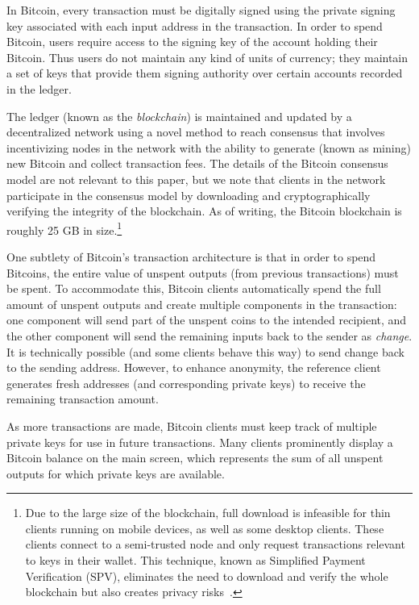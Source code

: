 In Bitcoin, every transaction must be digitally signed using the private signing key associated with each input address in the transaction. In order to spend Bitcoin, users require access to the signing key of the account holding their Bitcoin. Thus users do not maintain any kind of units of currency; they maintain a set of keys that provide them signing authority over certain accounts recorded in the ledger. 

The ledger (known as the \emph{blockchain}) is maintained and updated by a decentralized network using a novel method to reach consensus that involves incentivizing nodes in the network with the ability to generate (known as mining) new Bitcoin and collect transaction fees. The details of the Bitcoin consensus model are not relevant to this paper, but we note that clients in the network participate in the consensus model by downloading and cryptographically verifying the integrity of the blockchain. As of writing, the Bitcoin blockchain is roughly 25 GB in size.\footnote{Due to the large size of the blockchain, full download is infeasible for thin clients running on mobile devices, as well as some desktop clients. These clients connect to a semi-trusted node and only request transactions relevant to keys in their wallet. This technique, known as Simplified Payment Verification (SPV), eliminates the need to download and verify the whole blockchain but also creates privacy risks~\cite{SPVbugs}.}

One subtlety of Bitcoin's transaction architecture is that in order to spend Bitcoins, the entire value of unspent outputs (\ie from previous transactions) must be spent. To accommodate this, Bitcoin clients automatically spend the full amount of unspent outputs and create multiple components in the transaction: one component will send part of the unspent coins to the intended recipient, and the other component will send the remaining inputs back to the sender as \emph{change}. It is technically possible (and some clients behave this way) to send change back to the sending address. However, to enhance anonymity, the reference client generates fresh addresses (and corresponding private keys) to receive the remaining transaction amount. 

As more transactions are made, Bitcoin clients must keep track of multiple private keys for use in future transactions. Many clients prominently display a Bitcoin balance on the main screen, which represents the sum of all unspent outputs for which private keys are available. 

